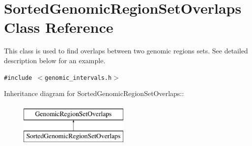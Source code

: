 \hypertarget{classSortedGenomicRegionSetOverlaps}{
\section{SortedGenomicRegionSetOverlaps Class Reference}
\label{classSortedGenomicRegionSetOverlaps}
}
This class is used to find overlaps between two genomic regions sets. See detailed description below for an example.  


{\tt \#include $<$genomic\_\-intervals.h$>$}

Inheritance diagram for SortedGenomicRegionSetOverlaps::\begin{figure}[H]
\begin{center}
\leavevmode
\includegraphics[height=2cm]{classSortedGenomicRegionSetOverlaps}
\end{center}
\end{figure}
